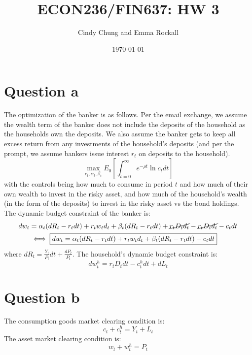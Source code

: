 \documentclass{article}
\title{ECON236/FIN637: HW 3}
\author{Cindy Chung and Emma Rockall}
\date{\today}
\begin{document}
\maketitle

\section*{Question a}
The optimization of the banker is as follows. Per the email exchange, we assume the wealth term of the banker does not include the deposits of the household as the households own the deposits. We also assume the banker gets to keep all excess return from any investments of the household's deposits (and per the prompt, we assume bankers issue interest $r_t$ on deposits to the household).
\[
\max_{c_t, \alpha_t, \beta_t} E_{0}\left[\int_{t=0}^{\infty} e^{-\rho t} \ln c_{t} d t\right]
\]
with the controls being how much to consume in period $t$ and how much of their own wealth to invest in the risky asset, and how much of the household's wealth (in the form of the deposits) to invest in the risky asset vs the bond holdings. The dynamic budget constraint of the banker is:
\[ \begin{aligned}
    d w_t &= \alpha_t (d R_t - r_t d t)  + r_t w_t d_t + \beta_t (d R_t - r_t d t)  + \cancel{r_t D_t d_t} - \cancel{r_t D_t d_t} - c_t d t \\
    & \iff \boxed{d w_t= \alpha_t (d R_t - r_t d t)  + r_t w_t d_t + \beta_t (d R_t - r_t d t) - c_t d t }
\end{aligned} \]
where $\boxed{d R_t = \frac{Y_t}{P_t} d t + \frac{d P_t}{P_t}}$.
The household's dynamic budget constraint is:
\[
\boxed{d w_t^h = r_t D_t d t  - c_t^h d t + d L_t}  
\]
\section*{Question b}
The consumption goods market clearing condition is:
\[
\boxed{c_t + c_t^h = Y_t + L_t    }
\]
The asset market clearing condition is:
\[
\boxed{w_t + w_t^h = P_t    }
\]
\end{document}
